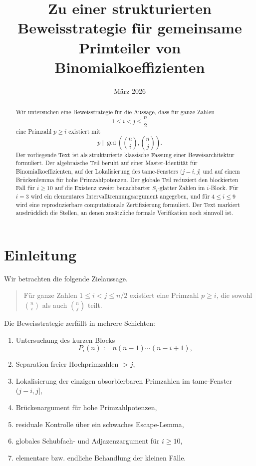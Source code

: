 \documentclass[12pt,a4paper]{article}
\title{Zu einer strukturierten Beweisstrategie für gemeinsame Primteiler von Binomialkoeffizienten}
\author{}
\date{März 2026}
\theoremstyle{plain}
\theoremstyle{definition}
\theoremstyle{remark}
\begin{document}
	
	\maketitle
	
	\begin{abstract}
		Wir untersuchen eine Beweisstrategie für die Aussage, dass für ganze Zahlen
		\[
		1\le i<j\le \frac n2
		\]
		eine Primzahl \(p\ge i\) existiert mit
		\[
		p\mid \gcd\!\left(\binom ni,\binom nj\right).
		\]
		Der vorliegende Text ist als strukturierte klassische Fassung einer Beweisarchitektur formuliert. Der algebraische Teil beruht auf einer Master-Identität für Binomialkoeffizienten, auf der Lokalisierung des tame-Fensters \((j-i,j]\) und auf einem Brückenlemma für hohe Primzahlpotenzen. Der globale Teil reduziert den blockierten Fall für \(i\ge10\) auf die Existenz zweier benachbarter \(S_i\)-glatter Zahlen im \(i\)-Block. Für \(i=3\) wird ein elementares Intervalltrennungsargument angegeben, und für \(4\le i\le9\) wird eine reproduzierbare computationale Zertifizierung formuliert. Der Text markiert ausdrücklich die Stellen, an denen zusätzliche formale Verifikation noch sinnvoll ist.
	\end{abstract}
	
	\tableofcontents
	
	\section{Einleitung}
	
	Wir betrachten die folgende Zielaussage.
	
	\begin{quote}
		Für ganze Zahlen \(1\le i<j\le n/2\) existiert eine Primzahl \(p\ge i\), die sowohl \(\binom ni\) als auch \(\binom nj\) teilt.
	\end{quote}
	
	Die Beweisstrategie zerfällt in mehrere Schichten:
	
	\begin{enumerate}[label=\arabic*)]
		\item Untersuchung des kurzen Blocks
		\[
		P_i(n):=n(n-1)\cdots(n-i+1),
		\]
		\item Separation freier Hochprimzahlen \(>j\),
		\item Lokalisierung der einzigen absorbierbaren Primzahlen im tame-Fenster \((j-i,j]\),
		\item Brückenargument für hohe Primzahlpotenzen,
		\item residuale Kontrolle über ein schwaches Escape-Lemma,
		\item globales Schubfach- und Adjazenzargument für \(i\ge10\),
		\item elementare bzw. endliche Behandlung der kleinen Fälle.
	\end{enumerate}
	
\end{document}
